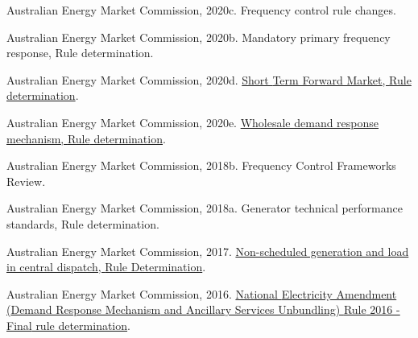 \documentclass[12pt,a4paper,]{report}
\newlength{\cslhangindent}
\newenvironment{CSLReferences}[2] %
 {%
  \setlength{\parindent}{0pt}
  \ifodd #1 \everypar{\setlength{\hangindent}{\cslhangindent}}\ignorespaces\fi
  \ifnum #2 > 0
  \setlength{\parskip}{#2\baselineskip}
  \fi
 }%
 {}
\begin{document}
\begin{CSLReferences}{1}{0}
\leavevmode{}%
Australian Energy Market Commission, 2020c. Frequency control rule
changes.

\leavevmode{}%
Australian Energy Market Commission, 2020b. Mandatory primary frequency
response, {Rule} determination.

\leavevmode{}%
Australian Energy Market Commission, 2020d.
\href{https://www.aemc.gov.au/sites/default/files/documents/final_determination_-_short_term_forward_market_-_clean.pdf}{Short
{Term Forward Market}, {Rule} determination}.

\leavevmode{}%
Australian Energy Market Commission, 2020e.
\href{https://www.aemc.gov.au/sites/default/files/documents/final_determination_-_for_publication.pdf}{Wholesale
demand response mechanism, {Rule} determination}.

\leavevmode{}%
Australian Energy Market Commission, 2018b. Frequency {Control
Frameworks Review}.

\leavevmode{}%
Australian Energy Market Commission, 2018a. Generator technical
performance standards, {Rule} determination.

\leavevmode{}%
Australian Energy Market Commission, 2017.
\href{https://www.aemc.gov.au/sites/default/files/content/0bcaf68c-8449-4ce0-aaa6-da223ca6e01c/Final-Determination-ERC0203-Non-scheduled-generation-and-load.pdf}{Non-scheduled
generation and load in central dispatch, {Rule Determination}}.

\leavevmode{}%
Australian Energy Market Commission, 2016.
\href{https://www.aemc.gov.au/sites/default/files/content/68cb8114-113d-4d96-91dc-5cb4b0f9e0ae/ERC0186-DRM-and-ASU-Final-rule-determination-FINAL.PDF}{National
{Electricity Amendment} ({Demand Response Mechanism} and {Ancillary
Services Unbundling}) {Rule} 2016 - {Final} rule determination}.


\end{CSLReferences}
\end{document}
